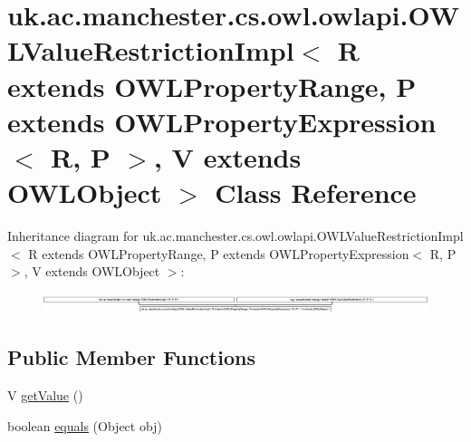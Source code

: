 \hypertarget{classuk_1_1ac_1_1manchester_1_1cs_1_1owl_1_1owlapi_1_1_o_w_l_value_restriction_impl_3_01_r_01extb41ab5275c9a4aea48395a608c721463}{\section{uk.\-ac.\-manchester.\-cs.\-owl.\-owlapi.\-O\-W\-L\-Value\-Restriction\-Impl$<$ R extends O\-W\-L\-Property\-Range, P extends O\-W\-L\-Property\-Expression$<$ R, P $>$, V extends O\-W\-L\-Object $>$ Class Reference}
\label{classuk_1_1ac_1_1manchester_1_1cs_1_1owl_1_1owlapi_1_1_o_w_l_value_restriction_impl_3_01_r_01extb41ab5275c9a4aea48395a608c721463}
}
Inheritance diagram for uk.\-ac.\-manchester.\-cs.\-owl.\-owlapi.\-O\-W\-L\-Value\-Restriction\-Impl$<$ R extends O\-W\-L\-Property\-Range, P extends O\-W\-L\-Property\-Expression$<$ R, P $>$, V extends O\-W\-L\-Object $>$\-:\begin{figure}[H]
\begin{center}
\leavevmode
\includegraphics[height=0.597015cm]{classuk_1_1ac_1_1manchester_1_1cs_1_1owl_1_1owlapi_1_1_o_w_l_value_restriction_impl_3_01_r_01extb41ab5275c9a4aea48395a608c721463}
\end{center}
\end{figure}
\subsection*{Public Member Functions}
\begin{DoxyCompactItemize}
\item 
V \hyperlink{classuk_1_1ac_1_1manchester_1_1cs_1_1owl_1_1owlapi_1_1_o_w_l_value_restriction_impl_3_01_r_01extb41ab5275c9a4aea48395a608c721463_ad76680e1f8aa3a053847c9ea0b07bda9}{get\-Value} ()
\item 
boolean \hyperlink{classuk_1_1ac_1_1manchester_1_1cs_1_1owl_1_1owlapi_1_1_o_w_l_value_restriction_impl_3_01_r_01extb41ab5275c9a4aea48395a608c721463_a96d88cc01ed7033e00a87f1015b89ae7}{equals} (Object obj)
\end{DoxyCompactItemize}
